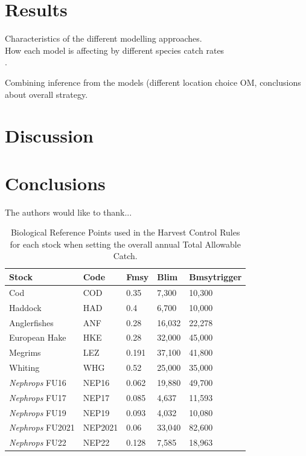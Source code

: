 \documentclass[12pt, halfline, a4paper]{ouparticle}
\begin{document}
\section{Results}
\label{res}

Characteristics of the different modelling approaches. \\

How each model is affecting by different species catch rates \\.

Combining inference from the models (different location choice OM, conclusions
about overall strategy. \\


\section{Discussion}
\label{dis}

\section{Conclusions}
\label{con}


\begin{notes}[Acknowledgements]
The authors would like to thank...
\end{notes}




\clearpage

\begin{table}
	\center
	\begin{tabular}{p{4cm} p{3cm} p{2cm} p{2cm} p{2cm}}
		\toprule
		Stock & Code & Fmsy & Blim & Bmsytrigger \\
		\hline
		Cod & COD & 0.35 & 7,300  & 10,300 \\
		Haddock & HAD & 0.4 & 6,700 & 10,000 \\
		Anglerfishes & ANF & 0.28 & 16,032 & 22,278 \\
		European Hake & HKE & 0.28 & 32,000 & 45,000 \\
		Megrims & LEZ & 0.191 & 37,100 & 41,800 \\
		Whiting & WHG & 0.52 & 25,000 & 35,000 \\
		\textit{Nephrops} FU16 & NEP16 & 0.062 & 19,880 & 49,700 \\
		\textit{Nephrops} FU17 & NEP17 & 0.085 & 4,637 & 11,593 \\
	        \textit{Nephrops} FU19 & NEP19 & 0.093 & 4,032 & 10,080 \\
		\textit{Nephrops} FU2021 & NEP2021 & 0.06 & 33,040 & 82,600 \\
		\textit{Nephrops} FU22 & NEP22 & 0.128 & 7,585 & 18,963 \\
		\bottomrule
	\end{tabular}
	\label{tab:brp}
	\caption{Biological Reference Points used in the Harvest Control Rules for each
		stock when setting the overall annual Total Allowable Catch.}
\end{table}
\end{document}
